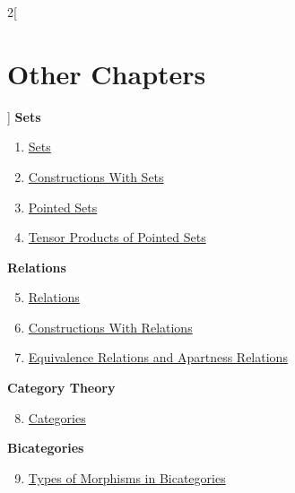 \begin{multicols}{2}[\section{Other Chapters}]
\noindent
\textbf{Sets}
\begin{enumerate}
\item \hyperref[sets:section-phantom]{Sets}
\item \hyperref[constructions-with-sets:section-phantom]{Constructions With Sets}
\item \hyperref[pointed-sets:section-phantom]{Pointed Sets}
\item \hyperref[tensor-products-of-pointed-sets:section-phantom]{Tensor Products of Pointed Sets}
\end{enumerate}
\textbf{Relations}
\begin{enumerate}
\setcounter{enumi}{4}
\item \hyperref[relations:section-phantom]{Relations}
\item \hyperref[constructions-with-relations:section-phantom]{Constructions With Relations}
\item \hyperref[equivalence-relations-and-apartness-relations:section-phantom]{Equivalence Relations and Apartness Relations}
\end{enumerate}
\textbf{Category Theory}
\begin{enumerate}
\setcounter{enumi}{7}
\item \hyperref[categories:section-phantom]{Categories}
\end{enumerate}
\textbf{Bicategories}
\begin{enumerate}
\setcounter{enumi}{8}
\item \hyperref[types-of-morphisms-in-bicategories:section-phantom]{Types of Morphisms in Bicategories}
\end{enumerate}
\end{multicols}
